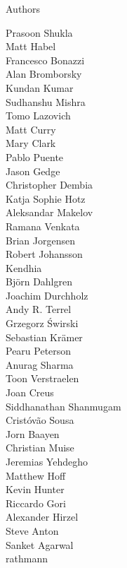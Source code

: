 \documentclass[xcolor=svgnames]{beamer}
\begin{document}
\begin{frame}{Authors}
\begin{multicols}{5}
          Prasoon Shukla\\
          Matt Habel\\
          Francesco Bonazzi\\
          Alan Bromborsky\\
          Kundan Kumar\\
          Sudhanshu Mishra\\
          Tomo Lazovich\\
          Matt Curry\\
          Mary Clark\\
          Pablo Puente\\
          Jason Gedge\\
          Christopher Dembia\\
          Katja Sophie Hotz\\
          Aleksandar Makelov\\
          Ramana Venkata\\
          Brian Jorgensen\\
          Robert Johansson\\
          Kendhia\\
          Björn Dahlgren\\
          Joachim Durchholz\\
          Andy R. Terrel\\
          Grzegorz Świrski\\
          Sebastian Krämer\\
          Pearu Peterson\\
          Anurag Sharma\\
          Toon Verstraelen\\
          Joan Creus\\
          Siddhanathan Shanmugam\\
          Cristóvão Sousa\\
          Jorn Baayen\\
          Christian Muise\\
          Jeremias Yehdegho\\
          Matthew Hoff\\
          Kevin Hunter\\
          Riccardo Gori\\
          Alexander Hirzel\\
          Steve Anton\\
          Sanket Agarwal\\
          rathmann\\

\end{multicols}
\end{frame}
\end{document}
